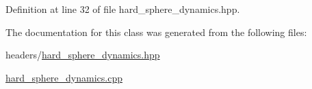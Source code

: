 Definition at line 32 of file hard\+\_\+sphere\+\_\+dynamics.\+hpp.



The documentation for this class was generated from the following files\+:\begin{DoxyCompactItemize}
\item 
headers/\hyperlink{hard__sphere__dynamics_8hpp}{hard\+\_\+sphere\+\_\+dynamics.\+hpp}\item 
\hyperlink{hard__sphere__dynamics_8cpp}{hard\+\_\+sphere\+\_\+dynamics.\+cpp}\end{DoxyCompactItemize}
